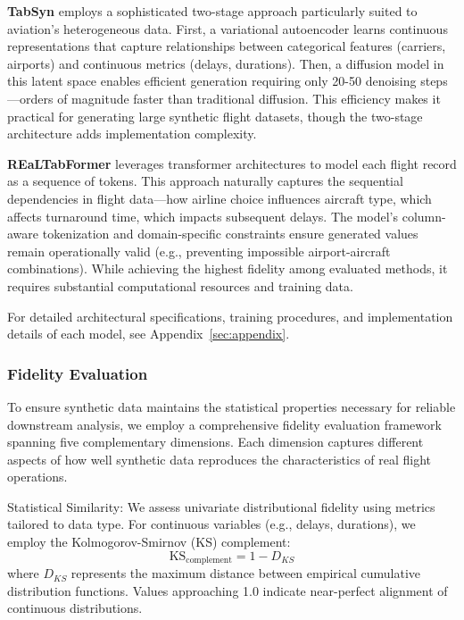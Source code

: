 \documentclass[conference]{IEEEtran}
\begin{document}
\textbf{TabSyn} \cite{zhang2024mixed} employs a sophisticated two-stage approach particularly suited to aviation's heterogeneous data. First, a variational autoencoder learns continuous representations that capture relationships between categorical features (carriers, airports) and continuous metrics (delays, durations). Then, a diffusion model in this latent space enables efficient generation requiring only 20-50 denoising steps—orders of magnitude faster than traditional diffusion. This efficiency makes it practical for generating large synthetic flight datasets, though the two-stage architecture adds implementation complexity.

\textbf{REaLTabFormer} \cite{solatorio2023realtabformer} leverages transformer architectures to model each flight record as a sequence of tokens. This approach naturally captures the sequential dependencies in flight data—how airline choice influences aircraft type, which affects turnaround time, which impacts subsequent delays. The model's column-aware tokenization and domain-specific constraints ensure generated values remain operationally valid (e.g., preventing impossible airport-aircraft combinations). While achieving the highest fidelity among evaluated methods, it requires substantial computational resources and training data.

For detailed architectural specifications, training procedures, and implementation details of each model, see Appendix~\ref{sec:appendix}.


\subsubsection{Fidelity Evaluation}

To ensure synthetic data maintains the statistical properties necessary for reliable downstream analysis, we employ a comprehensive fidelity evaluation framework spanning five complementary dimensions. Each dimension captures different aspects of how well synthetic data reproduces the characteristics of real flight operations.

Statistical Similarity:
We assess univariate distributional fidelity using metrics tailored to data type. For continuous variables (e.g., delays, durations), we employ the Kolmogorov-Smirnov (KS) complement:
\begin{equation}
\text{KS}_{\text{complement}} = 1 - D_{KS}
\end{equation}
where $D_{KS}$ represents the maximum distance between empirical cumulative distribution functions. Values approaching 1.0 indicate near-perfect alignment of continuous distributions.
\end{document}
